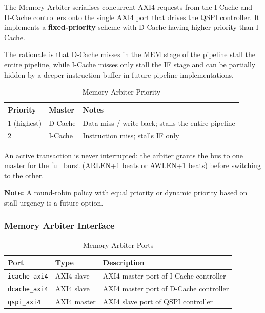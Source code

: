 The Memory Arbiter serialises concurrent AXI4 requests from the I-Cache
and D-Cache controllers onto the single AXI4 port that drives the QSPI
controller.
It implements a \textbf{fixed-priority} scheme with D-Cache having higher
priority than I-Cache.

The rationale is that D-Cache misses in the MEM stage of the pipeline
stall the entire pipeline, while I-Cache misses only stall the IF stage
and can be partially hidden by a deeper instruction buffer in future
pipeline implementations.

\begin{table}[H]
\caption{Memory Arbiter Priority}
\label{tab:asArbPriority}
\centering
\begin{tabularx}{\textwidth}{|l |l |X|}
  \hline
  Priority & Master & Notes \\
  \hline
  \hline
  1 (highest) & D-Cache & Data miss / write-back; stalls the entire pipeline \\
  \hline
  2           & I-Cache & Instruction miss; stalls IF only \\
  \hline
\end{tabularx}
\end{table}

An active transaction is never interrupted: the arbiter grants the bus to
one master for the full burst (ARLEN+1 beats or AWLEN+1 beats) before
switching to the other.

\textbf{Note:} A round-robin policy with equal priority or dynamic priority
based on stall urgency is a future option.

\subsubsection{Memory Arbiter Interface}

\begin{table}[H]
\caption{Memory Arbiter Ports}
\label{tab:asArbPorts}
\centering
\begin{tabularx}{\textwidth}{|l |l |X|}
  \hline
  Port & Type & Description \\
  \hline
  \hline
  \texttt{icache\_axi4} & AXI4 slave  & AXI4 master port of I-Cache controller \\
  \hline
  \texttt{dcache\_axi4} & AXI4 slave  & AXI4 master port of D-Cache controller \\
  \hline
  \texttt{qspi\_axi4}   & AXI4 master & AXI4 slave port of QSPI controller \\
  \hline
\end{tabularx}
\end{table}

